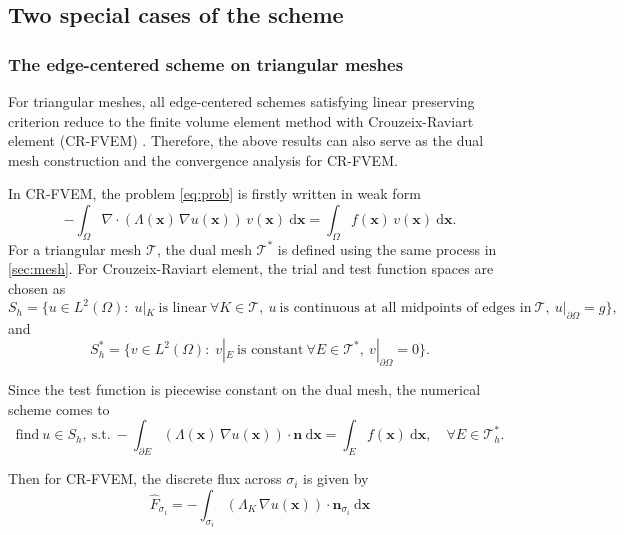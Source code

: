 \documentclass[times,review,preprint]{elsarticle}
\newcommand{\bx}{\bm{x}}
\newcommand{\bn}{\bm{n}}
\begin{document}
\subsection{Two special cases of the scheme}

\subsubsection{The edge-centered scheme on triangular meshes}

For triangular meshes, all edge-centered schemes satisfying linear preserving criterion reduce to the finite volume element method with Crouzeix-Raviart element (CR-FVEM) \cite{Chatzipantelidis1999}. Therefore, the above results can also serve as the dual mesh construction and the convergence analysis for CR-FVEM.

In CR-FVEM, the problem \cref{eq:prob} is firstly written in weak form
\begin{equation*}
-\int_{\Omega} \nabla \cdot (\Lambda(\bx) \, \nabla u(\bx)) \, v(\bx) \ \mathrm{d}\bx = \int_{\Omega} f(\bx) \, v(\bx) \ \mathrm{d}\bx.
\end{equation*}
For a triangular mesh $\mathcal{T}$, the dual mesh $\mathcal{T}^*$ is defined using the same process in \cref{sec:mesh}. For Crouzeix-Raviart element, the trial and test function spaces are chosen as
\begin{equation*}
S_h = \{u \in L^2(\Omega): \; u|_K \ \text{is linear} \ \forall K \in \mathcal{T}, \ u \ \text{is continuous at all midpoints of edges in} \ \mathcal{T}, \ u|_{\partial \Omega} = g\},
\end{equation*}
and
\begin{equation*}
S^*_h = \{v \in L^2(\Omega): \; v|_{E} \ \text{is constant} \ \forall E \in \mathcal{T}^*, \ v|_{\partial \Omega} = 0\}.
\end{equation*}

Since the test function is piecewise constant on the dual mesh, the numerical scheme comes to
\begin{equation}\label{eq:crfvem}
\text{find} \ u \in S_h, \ \text{s.t.} \ - \int_{\partial E} (\Lambda(\bx) \, \nabla u(\bx)) \cdot \bn \ \mathrm{d} \bx = \int_{E} f(\bx) \ \mathrm{d} \bx, \quad \forall E \in \mathcal{T}^*_h.
\end{equation}

Then for CR-FVEM, the discrete flux across $\sigma_i$ is given by
\begin{equation*}
\hat{F}_{\sigma_{i}} = - \int_{\sigma_{i}} (\Lambda_K \, \nabla u(\bx)) \cdot \bn_{\sigma_{i}} \ \mathrm{d} \bx
\end{equation*}
\end{document}
